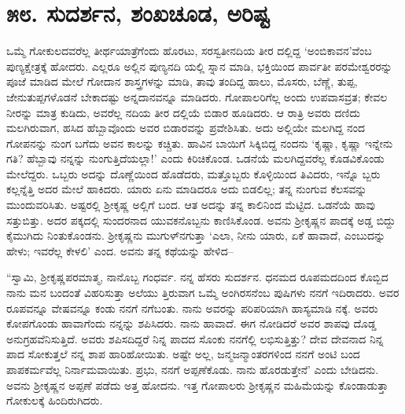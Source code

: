 
\chapter{೫೮. ಸುದರ್ಶನ, ಶಂಖಚೂಡ, ಅರಿಷ್ಟ}

ಒಮ್ಮೆ ಗೋಕುಲದವರೆಲ್ಲ ತೀರ್ಥಯಾತ್ರೆಗೆಂದು ಹೊರಟು, ಸರಸ್ವತೀನದಿಯ ತೀರ ದಲ್ಲಿದ್ದ ‘ಅಂಬಿಕಾವನ’ವೆಂಬ ಪುಣ್ಯಕ್ಷೇತ್ರಕ್ಕೆ ಹೋದರು. ಎಲ್ಲರೂ ಅಲ್ಲಿನ ಪುಣ್ಯನದಿ ಯಲ್ಲಿ ಸ್ನಾನ ಮಾಡಿ, ಭಕ್ತಿಯಿಂದ ಪಾರ್ವತೀ ಪರಮೇಶ್ವರರನ್ನು ಪೂಜೆ ಮಾಡಿದ ಮೇಲೆ ಗೋದಾನ ಶಾಸ್ತ್ರಗಳನ್ನು ಮಾಡಿ, ತಾವು ತಂದಿದ್ದ ಹಾಲು, ಮೊಸರು, ಬೆಣ್ಣೆ, ತುಪ್ಪ, ಜೇನುತುಪ್ಪಗಳೊಡನೆ ಬೇಕಾದಷ್ಟು ಅನ್ನದಾನವನ್ನೂ ಮಾಡಿದರು. ಗೋಪಾಲರಿಗೆಲ್ಲ ಅಂದು ಉಪವಾಸವ್ರತ; ಕೇವಲ ನೀರನ್ನು ಮಾತ್ರ ಕುಡಿದು, ಅವರೆಲ್ಲ ನದಿಯ ತೀರ ದಲ್ಲಿಯೆ ಬಿಡಾರ ಹೂಡಿದರು. ಆ ರಾತ್ರಿ ಅವರು ದಣಿದು ಮಲಗಿರುವಾಗ, ಹಸಿದ ಹೆಬ್ಬಾವೊಂದು ಅವರ ಬಿಡಾರವನ್ನು ಪ್ರವೇಶಿಸಿತು. ಅದು ಅಲ್ಲಿಯೇ ಮಲಗಿದ್ದ ನಂದ ಗೋಪನನ್ನು ನುಂಗ ಬಗೆದು ಅವನ ಕಾಲನ್ನು ಕಚ್ಚಿತು. ಹಾವಿನ ಬಾಯಿಗೆ ಸಿಕ್ಕಿಬಿದ್ದ ನಂದನು ‘ಕೃಷ್ಣಾ, ಕೃಷ್ಣಾ ಇನ್ನೇನು ಗತಿ? ಹೆಬ್ಬಾವು ನನ್ನನ್ನು ನುಂಗುತ್ತಿದೆಯಲ್ಲಾ!’ ಎಂದು ಕಿರಿಚಿಕೊಂಡ. ಒಡನೆಯೆ ಮಲಗಿದ್ದವರೆಲ್ಲ ಕೊಡವಿಕೊಂಡು ಮೇಲೆದ್ದರು. ಒಬ್ಬರು ಅದನ್ನು ದೊಣ್ಣೆಯಿಂದ ಹೊಡೆದರು, ಮತ್ತೊಬ್ಬರು ಕೊಳ್ಳಿಯಿಂದ ತಿವಿದರು, ಇನ್ನೊ ಬ್ಬರು ಕಲ್ಲನ್ನೆತ್ತಿ ಅದರ ಮೇಲೆ ಹಾಕಿದರು. ಯಾರು ಏನು ಮಾಡಿದರೂ ಅದು ಬಿಡಲಿಲ್ಲ; ತನ್ನ ನುಂಗುವ ಕೆಲಸವನ್ನು ಮುಂದುವರಿಸಿತು. ಅಷ್ಟರಲ್ಲಿ ಶ್ರೀಕೃಷ್ಣ ಅಲ್ಲಿಗೆ ಬಂದ. ಆತ ಅದನ್ನು ತನ್ನ ಕಾಲಿನಿಂದ ಮೆಟ್ಟಿದ. ಒಡನೆಯೆ ಹಾವು ಸತ್ತುಬಿತ್ತು. ಅದರ ಪಕ್ಕದಲ್ಲಿ ಸುಂದರನಾದ ಯುವಕನೊಬ್ಬನು ಕಾಣಿಸಿಕೊಂಡ. ಅವನು ಶ್ರೀಕೃಷ್ಣನ ಪಾದಕ್ಕೆ ಅಡ್ಡ ಬಿದ್ದು ಕೈಮುಗಿದು ನಿಂತುಕೊಂಡನು. ಶ್ರೀಕೃಷ್ಣನು ಮುಗುಳ್​ನಗುತ್ತಾ ‘ಎಲಾ, ನೀನು ಯಾರು, ಏಕೆ ಹಾವಾದೆ, ಎಂಬುದನ್ನು ಹೇಳು; ಇವರೆಲ್ಲ ಕೇಳಲಿ’ ಎಂದ. ಅವನು ತನ್ನ ಕಥೆಯನ್ನು ಹೇಳಿದ–

“ಸ್ವಾಮಿ, ಶ್ರೀಕೃಷ್ಣಪರಮಾತ್ಮ, ನಾನೊಬ್ಬ ಗಂಧರ್ವ. ನನ್ನ ಹೆಸರು ಸುದರ್ಶನ. ಧನಮದ ರೂಪಮದದಿಂದ ಕೊಬ್ಬಿದ ನಾನು ಮನ ಬಂದಂತೆ ವಿಹರಿಸುತ್ತಾ ಅಲೆಯು ತ್ತಿರುವಾಗ ಒಮ್ಮೆ ಅಂಗಿರಸನೆಂಬ ಪುಷಿಗಳು ನನಗೆ ಇದಿರಾದರು. ಅವರ ರೂಪವನ್ನೂ ವೇಷವನ್ನೂ ಕಂಡು ನನಗೆ ನಗೆಬಂತು. ನಾನು ಅವರನ್ನು ಪರಿಪರಿಯಾಗಿ ಹಾಸ್ಯಮಾಡಿ ನಕ್ಕೆ. ಅವರು ಕೋಪಗೊಂಡು ಹಾವಾಗೆಂದು ನನ್ನನ್ನು ಶಪಿಸಿದರು. ನಾನು ಹಾವಾದೆ. ಈಗ ನೋಡಿದರೆ ಅವರ ಶಾಪವು ದೊಡ್ಡ ಅನುಗ್ರಹವೆನಿಸುತ್ತಿದೆ. ಅವರು ಶಪಿಸದಿದ್ದರೆ ನಿನ್ನ ಪಾದದ ಸೊಂಕು ನನಗೆಲ್ಲಿ ಲಭಿಸುತ್ತಿತ್ತು? ದೇವ ದೇವನಾದ ನಿನ್ನ ಪಾದ ಸೋಕುತ್ತಲೆ ನನ್ನ ಶಾಪ ಹಾರಿಹೋಯಿತು. ಅಷ್ಟೇ ಅಲ್ಲ, ಜನ್ಮಜನ್ಮಾಂತರಗಳಿಂದ ನನಗೆ ಅಂಟಿ ಬಂದ ಪಾಪಕರ್ಮವೆಲ್ಲ ನಿರ್ನಾಮವಾಯಿತು. ಪ್ರಭು, ನನಗೆ ಅಪ್ಪಣೆಕೊಡು. ನಾನು ಹೊರಡುತ್ತೇನೆ’ ಎಂದು ಬೇಡಿದನು. ಅವನು ಶ್ರೀಕೃಷ್ಣನ ಅಪ್ಪಣೆ ಪಡೆದು ಅತ್ತ ಹೋದನು. ಇತ್ತ ಗೋಪಾಲರು ಶ್ರೀಕೃಷ್ಣನ ಮಹಿಮೆಯನ್ನು ಕೊಂಡಾಡುತ್ತಾ ಗೋಕುಲಕ್ಕೆ ಹಿಂದಿರುಗಿದರು.

